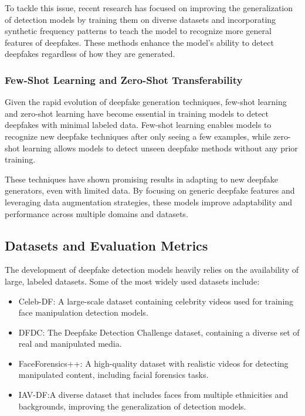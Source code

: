 \documentclass[lettersize,journal]{IEEEtran}
\begin{document}
To tackle this issue, recent research has focused on improving the generalization of detection models by training them on diverse datasets and incorporating synthetic frequency patterns to teach the model to recognize more general features of deepfakes. These methods enhance the model's ability to detect deepfakes regardless of how they are generated.

\subsubsection{Few-Shot Learning and Zero-Shot Transferability}

Given the rapid evolution of deepfake generation techniques, few-shot learning and zero-shot learning have become essential in training models to detect deepfakes with minimal labeled data. Few-shot learning enables models to recognize new deepfake techniques after only seeing a few examples, while zero-shot learning allows models to detect unseen deepfake methods without any prior training.\cite{huda2024fake}

These techniques have shown promising results in adapting to new deepfake generators, even with limited data. By focusing on generic deepfake features and leveraging data augmentation strategies, these models improve adaptability and performance across multiple domains and datasets.



\subsection{Datasets and Evaluation Metrics}

The development of deepfake detection models heavily relies on the availability of large, labeled datasets. Some of the most widely used datasets include:

\begin{itemize}
    \item Celeb-DF: A large-scale dataset containing celebrity videos used for training face manipulation detection models.

    \item DFDC: The Deepfake Detection Challenge dataset, containing a diverse set of real and manipulated media.

    \item FaceForensics++: A high-quality dataset with realistic videos for detecting manipulated content, including facial forensics tasks.

    \item IAV-DF:A diverse dataset that includes faces from multiple ethnicities and backgrounds, improving the generalization of detection models.\cite{huda2024fake}
\end{itemize}
\end{document}
